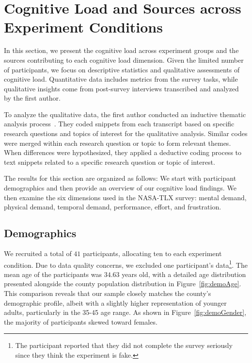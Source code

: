 \section{Cognitive Load and Sources across Experiment Conditions}
\label{sec:cog_result}
In this section, we present the cognitive load across experiment groups and the sources contributing to each cognitive load dimension. Given the limited number of participants, we focus on descriptive statistics and qualitative assessments of cognitive load. Quantitative data includes metrics from the survey tasks, while qualitative insights come from post-survey interviews transcribed and analyzed by the first author.

To analyze the qualitative data, the first author conducted an inductive thematic analysis process~\cite{olsonWaysKnowingHCI2014}. They coded snippets from each transcript based on specific research questions and topics of interest for the qualitative analysis. Similar codes were merged within each research question or topic to form relevant themes. When differences were hypothesized, they applied a deductive coding process to text snippets related to a specific research question or topic of interest.

The results for this section are organized as follows: We start with participant demographics and then provide an overview of our cognitive load findings. We then examine the six dimensions used in the NASA-TLX survey: mental demand, physical demand, temporal demand, performance, effort, and frustration.

\subsection{Demographics}
We recruited a total of $41$ participants, allocating ten to each experiment condition. Due to data quality concerns, we excluded one participant's data\footnote{The participant reported that they did not complete the survey seriously since they think the experiment is fake.}. The mean age of the participants was $34.63$ years old, with a detailed age distribution presented alongside the county population distribution in Figure~\ref{fig:demoAge}. This comparison reveals that our sample closely matches the county's demographic profile, albeit with a slightly higher representation of younger adults, particularly in the 35-45 age range. As shown in Figure~\ref{fig:demoGender}, the majority of participants skewed toward females.

